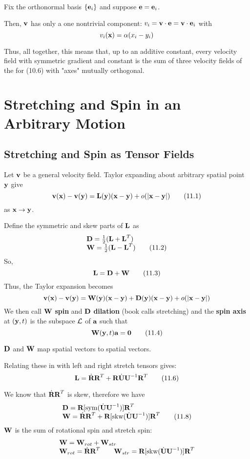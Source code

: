 \documentclass{article}
\begin{document}
Fix the orthonormal basis $\lbrace \textbf{e}_i\rbrace$ and suppose $\textbf{e} = \textbf{e}_i$. 

Then, $\textbf{v}$ has only a one nontrivial component: $v_i = \textbf{v}\cdot\textbf{e} = \textbf{v}\cdot\textbf{e}_i$ with
\[
	v_i(\textbf{x}) = \alpha(x_i-y_i)
\]

\begin{remark}
	Thus, all together, this means that, up to an additive constant, every velocity field with symmetric gradient and constant is the sum of three velocity fields of the for (10.6) with "axes" mutually orthogonal.
\end{remark}

\section{Stretching and Spin in an Arbitrary Motion}
\subsection{Stretching and Spin as Tensor Fields}
Let $\textbf{v}$ be a general velocity field. Taylor expanding about arbitrary spatial point $\textbf{y}$ give
\[
	\textbf{v}(\textbf{x}) - \textbf{v}(\textbf{y}) = \textbf{L}(\textbf{y})(\textbf{x} - \textbf{y}) + o(|\textbf{x} - \textbf{y}|)\tag{11.1}
\]
as $\textbf{x}\to\textbf{y}$.

Define the symmetric and skew parts of $\textbf{L}$ as
\[
\begin{array}{l}
\textbf{D} = \frac{1}{2}(\textbf{L} + \textbf{L}^T)\\
\textbf{W} = \frac{1}{2}(\textbf{L} - \textbf{L}^T)\tag{11.2}
\end{array}
\]
So,
\[
	\textbf{L} = \textbf{D} + \textbf{W}\tag{11.3}
\]
Thus, the Taylor expansion becomes
\[
	\textbf{v}(\textbf{x}) - \textbf{v}(\textbf{y}) = \textbf{W}(\textbf{y})(\textbf{x} - \textbf{y}) + \textbf{D}(\textbf{y})(\textbf{x} - \textbf{y}) + o(|\textbf{x} - \textbf{y}|)
\]
We then call $\textbf{W}$ \textbf{spin} and $\textbf{D}$ \textbf{dilation} (book calls stretching) and the \textbf{spin axis} at $(\textbf{y},t)$ is the subspace $\mathcal{L}$ of $\textbf{a}$ such that
\[
	\textbf{W}(\textbf{y},t)\textbf{a} = \boldsymbol{0}\tag{11.4}
\]
\begin{remark}
	$\textbf{D}$ and $\textbf{W}$ map spatial vectors to spatial vectors.
\end{remark}

Relating these in with left and right stretch tensors gives:
\[
	\textbf{L} = \dot{\textbf{R}}\textbf{R}^T + \textbf{R}\dot{\textbf{U}}\textbf{U}^{-1}\textbf{R}^T\tag{11.6}
\]

We know that $\dot{\textbf{R}}\textbf{R}^T$ is skew, therefore we have
\[
\begin{array}{l}
	\textbf{D} = \textbf{R}[\text{sym}(\dot{\textbf{U}}\textbf{U}^{-1})]\textbf{R}^T\\
	\textbf{W} = \dot{\textbf{R}}\textbf{R}^T + \textbf{R}[\text{skw}(\dot{\textbf{U}}\textbf{U}^{-1})]\textbf{R}^T\tag{11.8}
\end{array}
\]
$\textbf{W}$ is the sum of rotational spin and stretch spin:
\[
\begin{array}{l}
	\textbf{W} = \textbf{W}_{rot} + \textbf{W}_{str}\\
	\textbf{W}_{rot} = \dot{\textbf{R}}\textbf{R}^T \qquad \textbf{W}_{str} = \textbf{R}[\text{skw}(\dot{\textbf{U}}\textbf{U}^{-1})]\textbf{R}^T
\end{array}
\]
\end{document}
